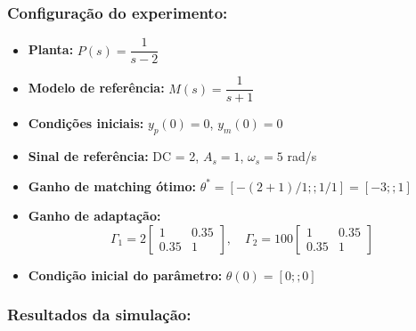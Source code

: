 \documentclass[10pt]{article}
\begin{document}
\subsubsection{Configuração do experimento:}
\begin{itemize}
\item \textbf{Planta:} $P(s) = \dfrac{1}{s - 2}$
\item \textbf{Modelo de referência:} $M(s) = \dfrac{1}{s + 1}$
\item \textbf{Condições iniciais:} $y_p(0)=0$, $y_m(0)=0$
\item \textbf{Sinal de referência:} DC = 2, $A_s=1$, $\omega_s=5$ rad/s
\item \textbf{Ganho de matching ótimo:} $\theta^* = [-(2+1)/1;;1/1] = [-3;;1]$
\item \textbf{Ganho de adaptação:} 
\[
\Gamma_1 = 2 \begin{bmatrix} 1 & 0.35 \\ 0.35 & 1 \end{bmatrix}, \quad
\Gamma_2 = 100 \begin{bmatrix} 1 & 0.35 \\ 0.35 & 1 \end{bmatrix}
\]
\item \textbf{Condição inicial do parâmetro:} $\theta(0) = [0;;0]$
\end{itemize}

\subsubsection{Resultados da simulação:}
\end{document}
